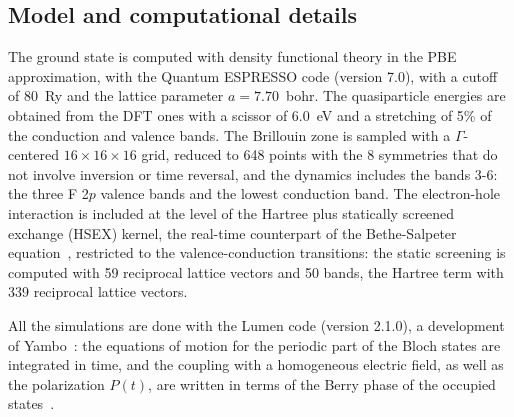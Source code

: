 \documentclass[aps,prb,reprint,superscriptaddress,amsmath,amssymb]{revtex4-2}
\begin{document}
\subsection{Model and computational details}
\label{sec:lif_methods}

The ground state is computed with density functional theory in the PBE approximation, with the Quantum ESPRESSO
code (version 7.0), with a cutoff of 80~Ry and the lattice parameter $a = 7.70$~bohr.
The quasiparticle energies are obtained from the DFT ones with a scissor of 6.0~eV and a stretching of 5\% of the
conduction and valence bands. The Brillouin zone is sampled with a $\Gamma$-centered $16\times16\times16$ grid, reduced
to 648 points with the 8 symmetries that do not involve inversion or time reversal, and the dynamics includes the bands
3-6: the three F 2$p$ valence bands and the lowest conduction band. The electron-hole interaction is included at the
level of the Hartree plus statically screened exchange (HSEX) kernel, the real-time counterpart of the Bethe-Salpeter
equation~\cite{Attaccalite2011}, restricted to the valence-conduction transitions: the static screening is computed
with 59 reciprocal lattice vectors and 50 bands, the Hartree term with 339 reciprocal lattice vectors.

All the simulations are done with the Lumen code (version 2.1.0), a development of Yambo~\cite{Sangalli2019}: the
equations of motion for the periodic part of the Bloch states are integrated in time, and the coupling with a
homogeneous electric field, as well as the polarization $P(t)$, are written in terms of the Berry phase of the occupied
states~\cite{Souza2004,Attaccalite2013}.
\end{document}
